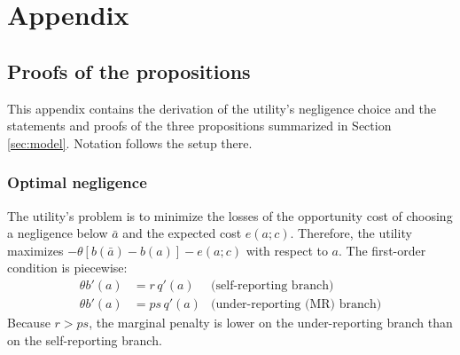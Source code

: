 \documentclass[12pt]{article}
\let\origfigure\figure
\let\endorigfigure\endfigure
\renewenvironment{figure}[1][htbp]{\origfigure[H]}{\endorigfigure}
\begin{document}

\clearpage
\endgroup

\clearpage
\appendix
\setcounter{figure}{0}
\renewcommand{\thefigure}{A\arabic{figure}}
\renewcommand{\theHfigure}{A\arabic{figure}}

\section{Appendix}\label{app}

\subsection{Proofs of the propositions}\label{app:proofs}

This appendix contains the derivation of the utility's negligence choice and the statements and proofs of the three propositions summarized in Section \ref{sec:model}. Notation follows the setup there.

	\subsubsection{Optimal negligence}
	
	The utility's problem is to minimize the losses of the opportunity cost of choosing a negligence below $\bar{a}$ and the expected cost $e(a;c)$. Therefore, the utility maximizes $-\theta[b(\bar{a}) - b(a)] - e(a;c)$ with respect to $a$.
    The first-order condition is piecewise:
	\begin{align}
		\theta b'(a) &= r\, q'(a) & \text{(self-reporting branch)} \\
		\theta b'(a) &= ps\, q'(a) & \text{(under-reporting (MR) branch)}
	\end{align}
	Because $r > ps$, the marginal penalty is lower on the under-reporting branch than on the self-reporting branch.
    
\end{document}
